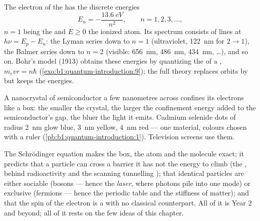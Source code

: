\begin{proposition}\label{prop:b1:quantum-introduction:hydrogen}
The electron of the  has the discrete energies
\[
E_n = -\frac{\qty{13.6}{eV}}{n^2} , \qquad n = 1, 2, 3, \ldots ,
\]
$n = 1$ being the  and $E \geq 0$ the ionized atom. Its
spectrum consists of lines at $h\nu = E_p - E_n$: the Lyman series down
to $n = 1$ (ultraviolet, \qty{122}{nm} for $2 \to 1$), the Balmer series
down to $n = 2$ (visible: \qty{656}{nm}, \qty{486}{nm}, \qty{434}{nm}, \ldots),
and so on. Bohr's model (1913) obtains these energies by quantizing the
 of a , $m_evr = n\hbar$
(\cref{exo:b1:quantum-introduction:9}); the full theory replaces orbits by
 but keeps the energies.
\end{proposition}
\admitted

\begin{example}\label{ex:b1:quantum-introduction:dot}
A nanocrystal of semiconductor a few nanometres across confines its
electrons like a box: the smaller the crystal, the larger the
confinement energy added to the semiconductor's gap, the bluer the
light it emits. Cadmium selenide dots of radius \qty{2}{nm} glow blue,
\qty{3}{nm} yellow, \qty{4}{nm} red --- one material, colours chosen with
a ruler (\cref{pb:b1:quantum-introduction:1}). Television screens use them.
\end{example}

\begin{remark}\label{rem:b1:quantum-introduction:rest}
The Schrödinger equation makes the box, the atom and the molecule
exact; it predicts that a particle can cross a barrier it has not the
energy to climb (the \emph{}, behind radioactivity and the
scanning tunnelling ); that identical particles are either
sociable (bosons --- hence the \emph{laser}, where photons pile into one
mode) or exclusive (fermions --- hence the periodic table and the
stiffness of matter); and that the spin of the electron is a  with no classical counterpart. All of it is Year 2 and beyond;
all of it rests on the few ideas of this chapter.
\end{remark}


